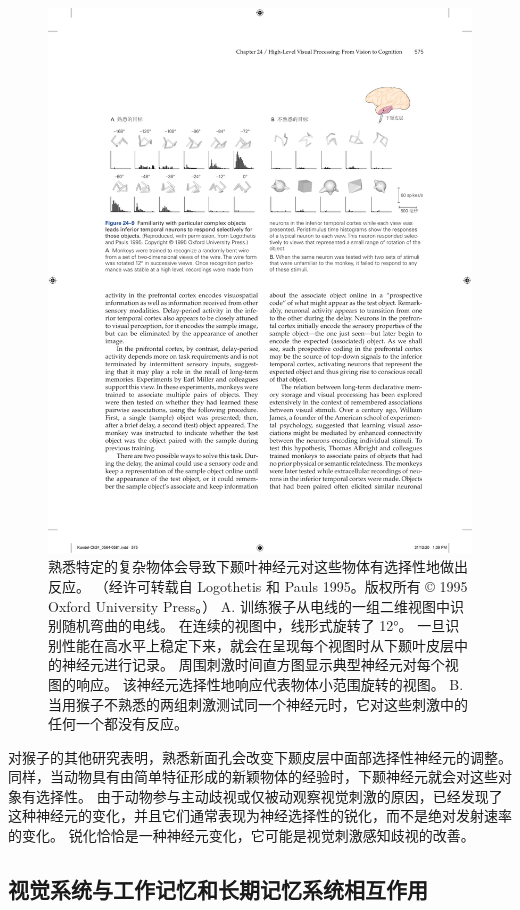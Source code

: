 \begin{figure}[htbp]
	\centering
	\includegraphics[width=0.9\linewidth]{chap24/fig_24_9}
	\caption{熟悉特定的复杂物体会导致下颞叶神经元对这些物体有选择性地做出反应。 （经许可转载自 Logothetis 和 Pauls 1995。版权所有 © 1995 Oxford University Press。） A. 训练猴子从电线的一组二维视图中识别随机弯曲的电线。 在连续的视图中，线形式旋转了 12°。 一旦识别性能在高水平上稳定下来，就会在呈现每个视图时从下颞叶皮层中的神经元进行记录。 周围刺激时间直方图显示典型神经元对每个视图的响应。 该神经元选择性地响应代表物体小范围旋转的视图。 B. 当用猴子不熟悉的两组刺激测试同一个神经元时，它对这些刺激中的任何一个都没有反应。}
	\label{fig:24_9}
\end{figure}


对猴子的其他研究表明，熟悉新面孔会改变下颞皮层中面部选择性神经元的调整。
同样，当动物具有由简单特征形成的新颖物体的经验时，下颞神经元就会对这些对象有选择性。
由于动物参与主动歧视或仅被动观察视觉刺激的原因，已经发现了这种神经元的变化，并且它们通常表现为神经选择性的锐化，而不是绝对发射速率的变化。
锐化恰恰是一种神经元变化，它可能是视觉刺激感知歧视的改善。



\subsection{视觉系统与工作记忆和长期记忆系统相互作用}

